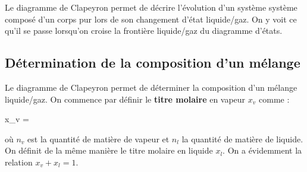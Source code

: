 \documentclass{cours}
\begin{document}
Le diagramme de Clapeyron permet de décrire l'évolution d'un système système composé d'un corps pur lors de son changement d'état liquide/gaz. On y voit ce qu'il se passe lorsqu'on croise la frontière liquide/gaz du diagramme d'états.
\begin{center}
\end{center}

\subsection{Détermination de la composition d'un mélange}%
\label{sub:determination_de_la_composition_d_un_melange}
Le diagramme de Clapeyron permet de déterminer la composition d'un mélange liquide/gaz. On commence par définir le \textbf{titre molaire} en vapeur $x_v$ comme :
\begin{eqencadre}
  x_v = 
\end{eqencadre}
où $n_v$ est la quantité de matière de vapeur et $n_l$ la quantité de matière de liquide. On définit de la même manière le titre molaire en liquide $x_l$. On a évidemment la relation $x_v+x_l=1$. 
\end{document}
